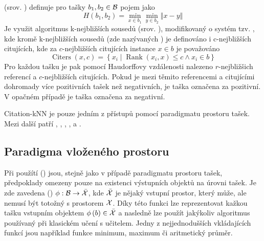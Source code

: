  (srov. \cite{wang_solving_2000}) definuje pro tašky \( b_1, b_2 \in \mathcal B \) pojem  jako
\[ H \left( b_1, b_2 \right) = \min_{x \in b_1} \min_{y \in b_2} \left\Vert x - y \right\Vert \]
Je využit algoritmus k-nejbližších sousedů (srov. \cite{dasarathy_nearest_1991}), modifikovaný o systém tzv. , kde kromě k-nejbližších sousedů (zde nazývaných ) je definováno i c-nejbližších citujících, kde za \( c \)-nejbližších citujících instance \( x \in b \) je považováno
\[ \operatorname{Citers} \left( x, c \right) = \left\{ x_i \middle| \operatorname{Rank} \left( x_i, x \right) \leq c \land x_i \in b \right\} \]
Pro každou tašku je pak pomocí Haudorffovy vzdálenosti nalezeno \( r \)-nejbližšich referencí a \( c \)-nejbližších citujících. Pokud je mezi těmito referencemi a citujícími dohromady více pozitivních tašek než negativních, je taška označena za pozitivní. V opačném případě je taška označena za negativní.

Citation-kNN je pouze jedním z přístupů pomocí paradigmatu prostoru tašek. Mezi další patří \cite{wang_solving_2000}, \cite{kwok_marginalized_2007}, \cite{gartner_multi-instance_2002}, \cite{haussler_convolution_1999}, \cite{zhou_multi-instance_2009} a \cite{muandet_learning_2012}.

\subsection{Paradigma vloženého prostoru}\label{embedded-space-paradigm}

Při použítí  () jsou, stejně jako v případě paradigmatu prostoru tašek, předpoklady omezeny pouze na existenci výstupních objektů na úrovni tašek. Je zde zavedena  () \( \phi : \mathcal B \to \bar{\mathcal X} \), kde \( \bar{\mathcal X} \) je nějaký vstupní prostor, který může, ale nemusí být totožný s prostorem \( \mathcal X \). Díky této funkci lze reprezentovat kažkou tašku vstupním objektem \( \phi \left( b \right) \in \bar{\mathcal X} \) a nasledně lze použít jakýkoliv algoritmus používaný při klasickém učení s učitelem. Jedny z nejjednodušších vkládajících funkcí jsou například funkce minimum, maximum či aritmetický průměr.

